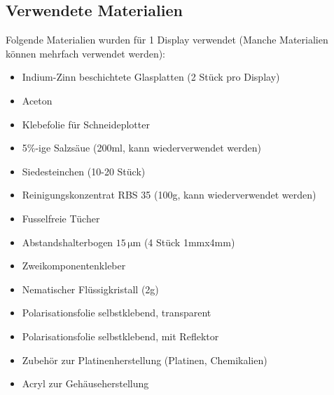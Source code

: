 
\subsection{Verwendete Materialien}

Folgende Materialien wurden für 1 Display verwendet (Manche Materialien können mehrfach verwendet werden):\\

\begin{itemize}
\item Indium-Zinn beschichtete Glasplatten (2 Stück pro Display)
\item Aceton
\item Klebefolie für Schneideplotter
\item 5\%-ige Salzsäue (200ml, kann wiederverwendet werden)
\item Siedesteinchen (10-20 Stück)
\item Reinigungskonzentrat RBS 35 (100g, kann wiederverwendet werden)
\item Fusselfreie Tücher
\item Abstandshalterbogen \(15\,\mathrm{\mu m}\) (4 Stück 1mmx4mm)
\item Zweikomponentenkleber
\item Nematischer Flüssigkristall (2g)
\item Polarisationsfolie selbstklebend, transparent
\item Polarisationsfolie selbstklebend, mit Reflektor
\item Zubehör zur Platinenherstellung (Platinen, Chemikalien)
\item Acryl zur Gehäuseherstellung
\end{itemize}